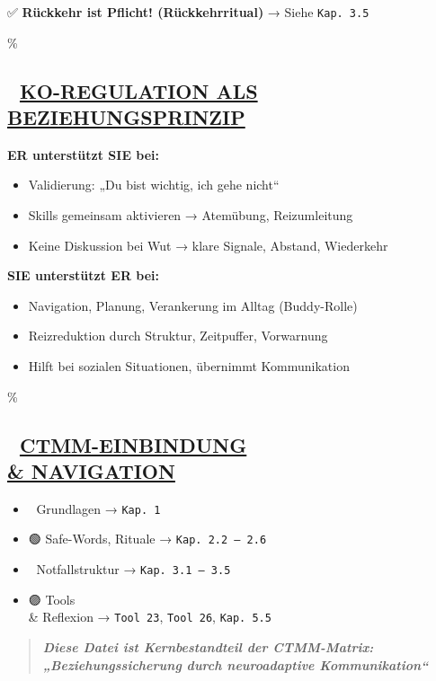 ✅ \textbf{Rückkehr ist Pflicht! (Rückkehrritual)} → Siehe \texttt{Kap.\ }\texttt{3.5}

\hypertarget{ko-regulation-als-beziehungsprinzip}{\%
\subsection{\texorpdfstring{🤝 \textbf{\ul{KO-REGULATION ALS BEZIEHUNGSPRINZIP}}}{🤝 KO-REGULATION ALS BEZIEHUNGSPRINZIP}}\label{ko-regulation-als-beziehungsprinzip}}

\textbf{ER unterstützt SIE bei:}

\begin{itemize}
\tightlist
\item
  Validierung: „Du bist wichtig, ich gehe nicht``
\item
  Skills gemeinsam aktivieren → Atemübung, Reizumleitung
\item
  Keine Diskussion bei Wut → klare Signale, Abstand, Wiederkehr
\end{itemize}

\textbf{SIE unterstützt ER bei:}

\begin{itemize}
\tightlist
\item
  Navigation, Planung, Verankerung im Alltag (Buddy-Rolle)
\item
  Reizreduktion durch Struktur, Zeitpuffer, Vorwarnung
\item
  Hilft bei sozialen Situationen, übernimmt Kommunikation
\end{itemize}

\hypertarget{ctmm-einbindung-navigation}{\%
\subsection{\texorpdfstring{🧭 \textbf{\ul{CTMM-EINBINDUNG \\& NAVIGATION}}}{🧭 CTMM-EINBINDUNG \\& NAVIGATION}}\label{ctmm-einbindung-navigation}}

\begin{itemize}
\tightlist
\item
  🔵 Grundlagen → \texttt{Kap.\ }\texttt{1}
\item
  🟢 Safe-Words, Rituale → \texttt{Kap.\ }\texttt{2.2\ –\ 2.6}
\item
  🔴 Notfallstruktur → \texttt{Kap.\ }\texttt{3.1\ –\ 3.5}
\item
  🟣 Tools \\& Reflexion → \texttt{Tool\ 23}, \texttt{Tool\ 26}, \texttt{Kap.\ }\texttt{5.5}
\end{itemize}

\begin{quote}
\emph{\textbf{Diese Datei ist Kernbestandteil der CTMM-Matrix: „Beziehungssicherung durch neuroadaptive Kommunikation``}}
\end{quote}
